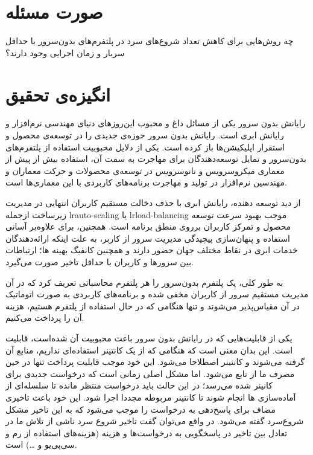 
\section{صورت مسئله}
\par 
چه روش‌هایی برای کاهش تعداد شروع‌های سرد در پلتفرم‌های بدون‌سرور  با حداقل سربار  و زمان اجرایی وجود دارند؟ 

\section{انگیزه‌ی تحقیق}
\par
رایانش بدون سرور یکی از مسائل داغ و محبوب این‌روز‌های دنیای مهندسی نرم‌افزار و رایانش ابری است. رایانش بدون سرور حوزه‌ی جدیدی را در توسعه‌ی محصول و استقرار اپلیکیشن‌ها باز کرده است. یکی از دلایل محبوبیت استفاده از پلتفرم‌های بدون‌سرور و تمایل توسعه‌دهندگان برای مهاجرت به سمت آن، استفاده بیش از پیش از معماری میکروسرویس و نانوسرویس در توسعه‌ی محصولات و حرکت معماران و مهندسین نرم‌افزار در تولید و مهاجرت برنامه‌های کاربردی با این معماری‌ها است.

\par 
از دید توسعه دهنده، رایانش ابری با حذف دخالت مستقیم کاربران انتهایی در مدیریت زیرساخت ازجمله lr{auto-scaling} یا lr{load-balancing} موجب بهبود سرعت توسعه محصول و تمرکز کاربران برروی منطق برنامه است. همچنین، برای علاوه‌بر آسانی استفاده و پنهان‌سازی پیچیدگی مدیریت سرور از کاربر، به علت اینکه ارائه‌دهندگان خدمات ابری در نقاط مختلف جهان حضور دارند و همچنین کانفیگ بهینه ها؛  ارتباطات بین سرورها و کاربران با حداقل تاخیر صورت می‌گیرد. 

\par
به طور کلی، یک‌ پلتفرم بدون‌سرور را هر پلتفرم محاسباتی تعریف کرد که در آن مدیریت مستقیم سرور از کاربران مخفی شده و برنامه‌های کاربردی به صورت اتوماتیک در آن مقیاس‌پذیر می‌شوند و تنها هنگامی که در حال استفاده از پلتفرم هستیم، هزینه آن را پرداخت می‌کنیم. \cite{The_Rise_of_Serverless_Computing}

\par 
یکی از قابلیت‌هایی که در رایانش بدون سرور باعث محبوبیت آن شده‌است، قابلیت  است. این بدان معنی است که هنگامی که از یک کانتینر استفاده‌ای نداریم، منابع آن گرفته‌ می‌شوند و کانتینر اصطلاحا  می‌شود. این خود موجب قابلیت پرداخت تنها در حین مصرف ما از تابع می‌شود. اما مشکل اصلی زمانی است که درخواست جدیدی برای کانینر  شده می‌رسد؛ در این حالت باید درخواست منتظر مانده تا سلسله‌ای از آماده‌سازی ها انجام شوند تا کانتینر مربوطه مجددا اجرا شود. این خود باعث تاخیری مضاف برای پاسخ‌دهی به درخواست را موجب می‌شود که به این تاخیر مشکل شروع‌سرد   گفته می‌شود. در واقع می‌توان گفت تاخیر شروع سرد ناشی از تلاش ما در تعادل بین تاخیر در پاسخگویی به درخواست‌ها و هزینه (هزینه‌های استفاده از رم و سی‌پی‌یو و …) است.

